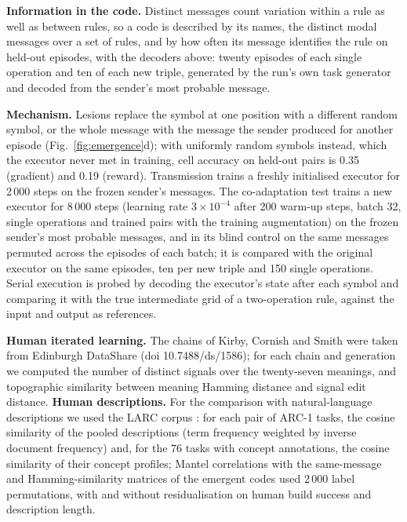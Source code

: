 \documentclass{nature}
\begin{document}
\begin{methods}
\textbf{Information in the code.} Distinct messages count variation within a rule as well as between rules,
so a code is described by its names, the distinct modal messages over a set of rules, and by how often its
message identifies the rule on held-out episodes, with the decoders above: twenty episodes of each single
operation and ten of each new triple, generated by the run's own task generator and decoded from the sender's
most probable message.

\textbf{Mechanism.} Lesions replace the symbol at one position with a different random symbol, or the whole
message with the message the sender produced for another episode (Fig.~\ref{fig:emergence}d); with uniformly
random symbols instead, which the executor never met in training, cell accuracy on held-out pairs is 0.35
(gradient) and 0.19 (reward). Transmission trains a freshly initialised executor for 2\,000 steps on the frozen
sender's messages. The co-adaptation test trains a new executor for 8\,000 steps (learning rate
$3\times10^{-4}$ after 200 warm-up steps, batch 32, single operations and trained pairs with the training
augmentation) on the frozen sender's most probable messages, and in its blind control on the same messages
permuted across the episodes of each batch; it is compared with the original executor on the same episodes, ten
per new triple and 150 single operations. Serial execution is probed by decoding the executor's state after
each symbol and comparing it with the true intermediate grid of a two-operation rule, against the input and
output as references.

\textbf{Human iterated learning.} The chains of Kirby, Cornish and Smith \cite{kirby2008} were taken
from Edinburgh DataShare (doi 10.7488/ds/1586); for each chain and generation we computed the number
of distinct signals over the twenty-seven meanings, and topographic similarity between meaning
Hamming distance and signal edit distance. \textbf{Human descriptions.} For the comparison with
natural-language descriptions we used the LARC corpus \cite{acquaviva2022}: for each pair of ARC-1
tasks, the cosine similarity of the pooled descriptions (term frequency weighted by inverse document
frequency) and, for the 76 tasks with concept annotations, the cosine similarity of their concept
profiles; Mantel correlations with the same-message and Hamming-similarity matrices of the emergent
codes used 2\,000 label permutations, with and without residualisation on human build success and
description length.


\end{methods}
\end{document}
